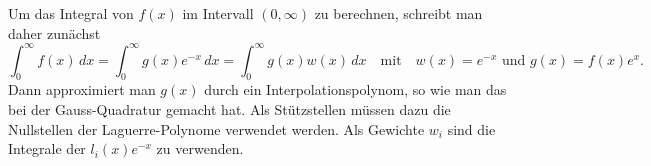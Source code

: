 Um das Integral von $f(x)$ im Intervall $(0,\infty)$ zu berechnen,
schreibt man daher zunächst
\[
\int_0^\infty f(x)\,dx
=
\int_0^\infty g(x)e^{-x}\,dx
=
\int_0^\infty g(x) w(x)\,dx
\quad\text{mit}\quad
w(x)=e^{-x}
\text{ und }
g(x)=f(x)e^x.
\]
Dann approximiert man $g(x)$ durch ein Interpolationspolynom,
so wie man das bei der Gauss-Quadratur gemacht hat.
Als Stützstellen müssen dazu die Nullstellen der Laguerre-Polynome
verwendet werden.
Als Gewichte $w_i$ sind die Integrale der $l_i(x)e^{-x}$
zu verwenden.





